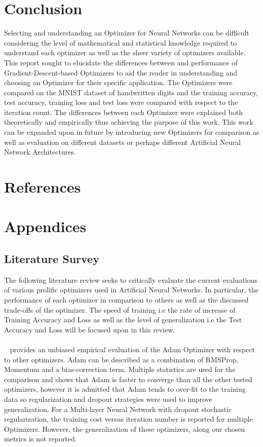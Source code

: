 \documentclass{article}
\begin{document}
\section{Conclusion}
Selecting and understanding an Optimizer for Neural Networks can be difficult considering the level of mathematical and statistical knowledge required to understand each optimizer as well as the sheer variety of optimizers available. This report sought to elucidate the differences between and performance of Gradient-Descent-based Optimizers to aid the reader in understanding and choosing an Optimizer for their specific application. The Optimizers were compared on the MNIST dataset of handwritten digits and the training accuracy, test accuracy, training loss and test loss were compared with respect to the iteration count. The differences between each Optimizer were explained both theoretically and empirically thus achieving the purpose of this work. This work can be expanded upon in future by introducing new Optimizers for comparison as well as evaluation on different datasets or perhaps different Artificial Neural Network Architectures. 


\section{References}	
	


\section{Appendices}
\subsection{Literature Survey}	
The following literature review seeks to critically evaluate the current evaluations of various prolific optimizers used in Artificial Neural Networks. In particular, the performance of each optimizer in comparison to others as well as the discussed trade-offs of the optimizer. The speed of training i.e the rate of increase of Training Accuracy and Loss as well as the level of generalization i.e the Test Accuracy and Loss will be focused upon in this review.


\paragraph{}~\citet{kingma2014adam} provides an unbiased empirical evaluation of the Adam Optimizer with respect to other optimizers. Adam can be described as a combination of RMSProp, Momentum and a bias-correction term.
Multiple statistics are used for the comparison and shows that Adam is faster to converge than all the other tested optimizers, however it is admitted that Adam tends to over-fit to the training data so regularization and dropout strategies were used to improve generalization. For a Multi-layer Neural Network with dropout stochastic regularization, the training cost versus iteration number is reported for multiple Optimizers. However, the generalization of these optimizers, along our chosen metrics is not reported.
\end{document}
